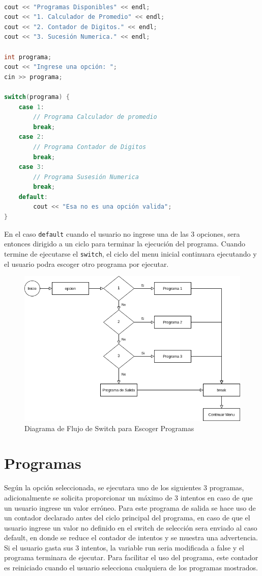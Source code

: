 \documentclass[12pt]{article}
\begin{document}
\begin{lstlisting}[language=c++]

cout << "Programas Disponibles" << endl;
cout << "1. Calculador de Promedio" << endl;
cout << "2. Contador de Digitos." << endl;
cout << "3. Sucesión Numerica." << endl;

int programa;
cout << "Ingrese una opción: ";
cin >> programa;

switch(programa) {
    case 1:
        // Programa Calculador de promedio
        break;
    case 2:
        // Programa Contador de Digitos
        break;
    case 3:
        // Programa Susesión Numerica
        break;
    default:
        cout << "Esa no es una opción valida";
}
\end{lstlisting}

En el caso \verb+default+ cuando el usuario no ingrese una de las 3 opciones, sera entonces dirigido a un ciclo para terminar la ejecución del programa. Cuando termine de ejecutarse el \verb+switch+, el ciclo del menu inicial continuara ejecutando y el usuario podra escoger otro programa por ejecutar.

\begin{figure}[H]
    \caption{Diagrama de Flujo de Switch para Escoger Programas}
    \centering
    \includegraphics[scale=0.6]{switch_menu.png}
\end{figure}

\pagebreak

\section{Programas}

Según la opción seleccionada, se ejecutara uno de los siguientes 3 programas, adicionalmente se solicita proporcionar un máximo de 3 intentos en caso de que un usuario ingrese un valor erróneo. Para este programa de salida se hace uso de un contador declarado antes del ciclo principal del programa, en caso de que el usuario ingrese un valor no definido en el switch de selección sera enviado al caso default, en donde se reduce el contador de intentos y se muestra una advertencia. Si el usuario gasta sus 3 intentos, la variable run seria modificada a false y el programa terminara de ejecutar. Para facilitar el uso del programa, este contador es reiniciado cuando el usuario selecciona cualquiera de los programas mostrados.
\end{document}
